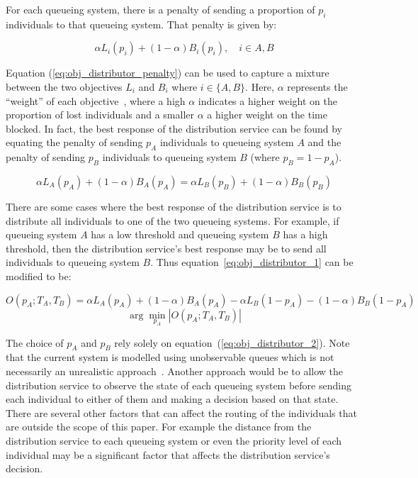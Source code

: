 For each queueing system, there is a penalty of sending a proportion of \(p_i\)
individuals to that queueing system.
That penalty is given by:

\begin{equation}\label{eq:obj_distributor_penalty}
    \alpha L_i(p_i) + (1 - \alpha) B_i(p_i), \quad i \in {A, B}
\end{equation}

Equation (\ref{eq:obj_distributor_penalty}) can be used to capture a mixture
between the two objectives \(L_i\) and \(B_i\) where \(i \in \{A, B\}\).
Here, \(\alpha\) represents the ``weight'' of each
objective~\cite{gunantara2018review},
where a high \(\alpha\) indicates a higher weight on the proportion of lost
individuals and a smaller \(\alpha\) a higher weight on the time blocked.
In fact, the best response of the distribution service can be found by equating
the penalty of sending \(p_A\) individuals to queueing system \(A\) and the
penalty
of sending \(p_B\) individuals to queueing system \(B\) (where \(p_B = 1-p_A\)).

\begin{equation}\label{eq:obj_distributor_1}
    \alpha L_A(p_A) + (1 - \alpha) B_A(p_A) =
    \alpha L_B(p_B) + (1 - \alpha) B_B(p_B)
\end{equation}

There are some cases where the best response of the distribution service is
to distribute all individuals to one of the two queueing systems.
For example, if queueing system \(A\) has a low threshold and queueing system
\(B\)
has a high threshold, then the distribution service's best response may be to
send all individuals to queueing system \(B\).
Thus equation~\ref{eq:obj_distributor_1} can be modified to be:

\begin{equation*}
    O(p_A; T_A, T_B) = \alpha L_A(p_A) + (1 - \alpha) B_A(p_A) -
    \alpha L_B(1 - p_A) - (1 - \alpha)B_B(1 - p_A)
\end{equation*}
\begin{equation}\label{eq:obj_distributor_2}
    \arg \min_{p_A} |O(p_A; T_A, T_B)|
\end{equation}


The choice of \(p_A\) and \(p_B\) rely solely on
equation~(\ref{eq:obj_distributor_2}).
Note that the current system is modelled using unobservable queues which is not
necessarily an unrealistic approach~\cite{unobservablequeue}.
Another approach would be to allow the distribution service to observe the
state of each queueing system before sending each individual to either of them
and making a decision based on that state.
There are several other factors that can affect the routing of the
individuals that are outside the scope of this paper.
For example the distance from the distribution service to each queueing system
or even the priority level of each individual may be a significant factor that
affects the distribution service's decision.



